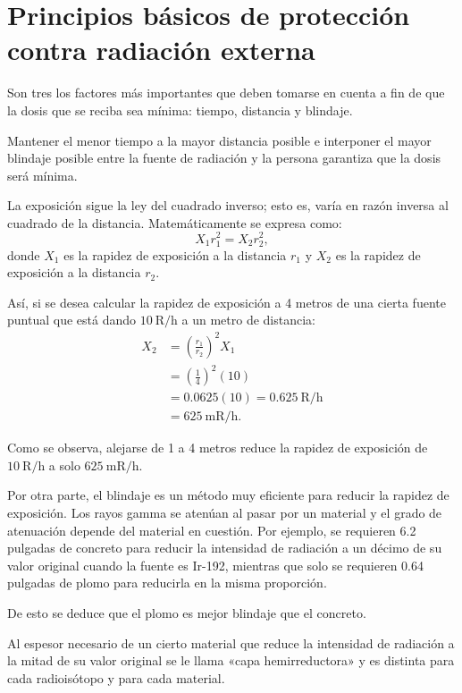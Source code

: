 \chapter[Principios de protección]{Principios básicos de protección contra radiación externa}

Son tres los factores más importantes que deben tomarse en cuenta a fin de que la dosis que se reciba sea mínima: tiempo, distancia y blindaje.

Mantener el menor tiempo a la mayor distancia posible e interponer el mayor blindaje posible entre la fuente de radiación y la persona garantiza que la dosis será mínima.

La exposición sigue la ley del cuadrado inverso; esto es, varía en razón inversa al cuadrado de la distancia. Matemáticamente se expresa como:
\[
X_1r_1^2=X_2r_2^2,
\]
donde $X_1$ es la rapidez de exposición a la distancia $r_1$ y $X_2$ es la rapidez de exposición a la distancia $r_2$.

Así, si se desea calcular la rapidez de exposición a 4 metros de una cierta fuente puntual que está dando $10\ \mathrm{R/h}$ a un metro de distancia:
\begin{align*}
X_2 &= \left(\frac{r_1}{r_2}\right)^2X_1\\
     &= \left(\frac{1}{4}\right)^2(10)\\
     &= 0.0625(10)=0.625\ \mathrm{R/h}\\
     &= 625\ \mathrm{mR/h}.
\end{align*}

Como se observa, alejarse de 1 a 4 metros reduce la rapidez de exposición de $10\ \mathrm{R/h}$ a solo $625\ \mathrm{mR/h}$.

Por otra parte, el blindaje es un método muy eficiente para reducir la rapidez de exposición. Los rayos gamma se atenúan al pasar por un material y el grado de atenuación depende del material en cuestión. Por ejemplo, se requieren 6.2 pulgadas de concreto para reducir la intensidad de radiación a un décimo de su valor original cuando la fuente es Ir-192, mientras que solo se requieren 0.64 pulgadas de plomo para reducirla en la misma proporción.

De esto se deduce que el plomo es mejor blindaje que el concreto.

Al espesor necesario de un cierto material que reduce la intensidad de radiación a la mitad de su valor original se le llama «capa hemirreductora» y es distinta para cada radioisótopo y para cada material.

